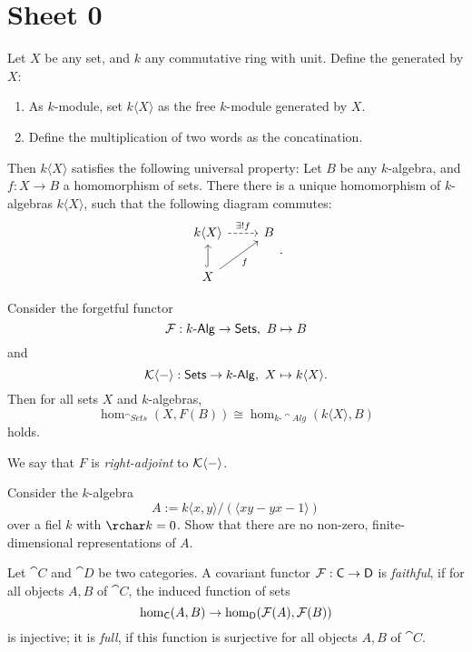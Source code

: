 \setcounter{section}{-1}

\section{Sheet 0}
\begin{defn}
Let $X$ be any set, and $k$ any commutative ring with unit. Define the  generated by $X$:
\begin{enumerate}
  \item As $k$-module, set $k\langle X\rangle$ as the free $k$-module generated by $X$.
  \item Define the multiplication of two words as the concatination.
\end{enumerate}
\end{defn}
Then $k\langle X\rangle$ satisfies the following universal property: Let $B$ be any $k$-algebra, and $f:X\to B$ a homomorphism of sets. There there is a unique homomorphism of $k$-algebras $k\langle X\rangle$, such that the following diagram commutes:
\[
\begin{tikzcd}
  k\langle X\rangle \ar[dashed]{r}{\exists!f}&B\\
  X\ar[\embarr]{u}\ar[swap]{ur}{f}&
\end{tikzcd}.
\]
\begin{prop}
  Consider the forgetful functor
  \[
  \mathcal{F}:k\text{-}\mathsf{Alg}\to \mathsf{Sets},~B\mapsto B
  \]
  and
  \[
  \mathcal{K}\langle-\rangle:\mathsf{Sets}\to k\text{-}\mathsf{Alg},~X\mapsto k\langle X\rangle .
  \]
  Then for all sets $X$ and $k$-algebras,
  \[
  \hom_{{\cat{Sets}}}(X,F(B))\cong \hom_{k\text{-}\cat{Alg}}(k\langle X \rangle,B)
  \]
  holds.
\end{prop}
We say that $F$ is \emph{right-adjoint} to $\mathcal{K}\langle-\rangle$.
\begin{probl}
  Consider the $k$-algebra
  \[
  A:=k\langle x,y\rangle/(\langle xy-yx-1\rangle)
  \]
  over a fiel $k$ with $\rchar k=0$. Show that there are no non-zero, finite-dimensional representations of $A$.
\end{probl}

\begin{defn}
  Let $\cat{C}$ and $\cat{D}$ be two categories. A covariant functor $\mathcal{F}:\mathsf{C}\to \mathsf{D}$ is \emph{faithful}, if for all objects $A,B$ of $\cat{C}$, the induced function of sets
  \[
  \hom_{\mathsf{C}}(A,B)\to \hom_{\mathsf{D}}(\mathcal{F}(A),\mathcal{F}(B))
  \]
  is injective; it is \emph{full}, if this function is surjective for all objects $A,B$ of $\cat{C}$.
\end{defn}

